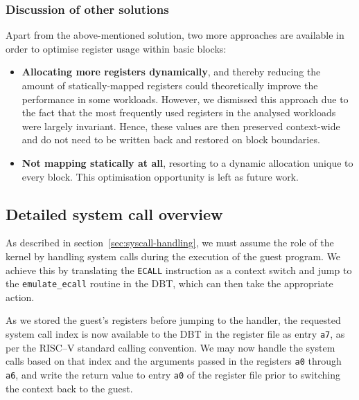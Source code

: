 \subsubsection{Discussion of other solutions}
Apart from the above-mentioned solution, two more approaches are available in order to optimise register usage within basic blocks:
\begin{itemize}
	\item \textbf{Allocating more registers dynamically}, and thereby reducing the amount of statically-mapped registers could theoretically improve the performance in some workloads.
	However, we dismissed this approach due to the fact that the most frequently used registers in the analysed workloads were largely invariant.
	Hence, these values are then preserved context-wide and do not need to be written back and restored on block boundaries.
	
	\item \textbf{Not mapping statically at all}, resorting to a dynamic allocation unique to every block.
	This optimisation opportunity is left as future work.
\end{itemize}

\subsection{Detailed system call overview}
As described in section~\vref{sec:syscall-handling}, we must assume the role of the kernel by handling system calls during the execution of the guest program.
We achieve this by translating the \texttt{ECALL} instruction as a context switch and jump to the \texttt{emulate\_ecall} routine in the DBT, which can then take the appropriate action.

As we stored the guest's registers before jumping to the handler, the requested system call index is now available to the DBT in the register file as entry \texttt{a7}, as per the RISC--V standard calling convention.
We may now handle the system calls based on that index and the arguments passed in the registers \texttt{a0} through \texttt{a6}, and write the return value to entry \texttt{a0} of the register file prior to switching the context back to the guest.

